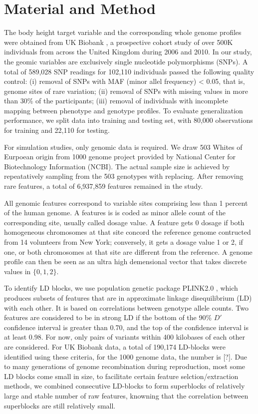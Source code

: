 \documentclass[acmtog, authorversion]{acmart}
\begin{document}
\section{Material and Method}
The body height target variable and the corresponding whole genome profiles were obtained from UK Biobank \cite{Data:UK_Biobank}, a prospective cohort study of over 500K individuals from across the United Kingdom during 2006 and 2010. In our study, the geomic variables are exclusively single nucleotide polymorphisms (SNPs). A total of 589,028 SNP readings for 102,110 individuals passed the following quality control: (i) removal of SNPs with MAF (minor allel frequency) < 0.05, that is, genome sites of rare variation; (ii) removal of SNPs with missing values in more than 30\% of the participants; (iii) removal of individuals with incomplete mapping between phenotype and genotype profiles. To evaluate generalization performance, we split data into training and testing set, with 80,000 observations for training and 22,110 for testing. 

For simulation studies, only genomic data is required. We draw 503 Whites of Eurpoean origin from 1000 genome project \cite{Data:1K_Genome} provided by National Center for Biotechnology Information (NCBI). The actual sample size is achieved by repeatatively sampling from the 503 genotypes with replacing. After removing rare features, a total of 6,937,859 features remained in the study.

All genomic features correspond to variable sites comprising less than 1 percent of the human genome. A features is is coded as minor allele count of the corresponding site, usually called dosage value. A feature gets 0 dosage if both homogeneous chromosomes at that site concord the reference genome contructed from 14 volunteers from New York; conversely, it gets a dosage value 1 or 2, if one, or both chromosomes at that site are different from the reference. A genome profile can then be seen as an ultra high demensional vector that takes discrete values in $\{0, 1, 2\}$.

To identify LD blocks, we use population genetic package PLINK2.0 \cite{PK:Plink2}, which produces subsets of features that are in approximate linkage disequilibrium (LD) with each other. It is based on correlations between genotype allele counts. Two features are considered to be in strong LD if the bottom of the 90\% $D\prime$ confidence interval is greater than 0.70, and the top of the confidence interval is at least 0.98. For now, only pairs of variants within 400 kilobases of each other are considered. For UK Biobank data, a total of 190,174 LD-blocks were identified using these criteria, for the 1000 genome data, the number is [?]. Due to many generations of genome recombination during reproduction, most some LD blocks come small in size, to facilitate certain feature selction/extraction methods, we combined consecutive LD-blocks to form superblocks of relatively large and stable number of raw features, knowning that the correlation between superblocks are still relatively small.
\end{document}

